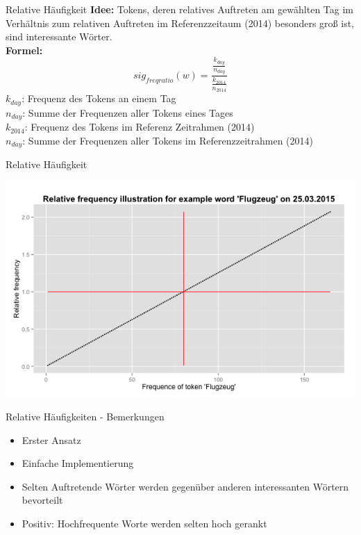 \documentclass{beamer}
\begin{document}
\begin{frame}{Relative Häufigkeit}
	\textbf{Idee: } Tokens, deren relatives Auftreten am gewählten Tag im Verhältnis zum relativen Auftreten im Referenzzeitaum (2014) besonders groß ist, sind interessante Wörter.\\ 
	\textbf{Formel: } 
	\begin{equation}
	sig_{freqratio}(w) = \frac{\frac{k_{day}}{n_{day}}}{\frac{k_{2014}}{n_{2014}}}
	\end{equation}
	$k_{day}$: Frequenz des Tokens an einem Tag\\
	$n_{day}$: Summe der Frequenzen aller Tokens eines Tages\\
	$k_{2014}$: Frequenz des Tokens im Referenz Zeitrahmen (2014)\\
	$n_{day}$: Summe der Frequenzen aller Tokens im Referenzzeitrahmen (2014)\\
\end{frame}

\begin{frame}{Relative Häufigkeit}
	  \begin{centering}
	  \includegraphics[width=1\textwidth]{pictures/relfreqFlugzeug.png}
	\end{centering}
\end{frame}

\begin{frame}{Relative H\"aufigkeiten - Bemerkungen}
\begin{itemize}
 	\item Erster Ansatz
 	\item Einfache Implementierung
 	\item Selten Auftretende W\"orter werden gegen\"uber anderen interessanten W\"ortern bevorteilt
	\item{Positiv: Hochfrequente Worte werden selten hoch gerankt}
 \end{itemize}
\end{frame}
\end{document}
